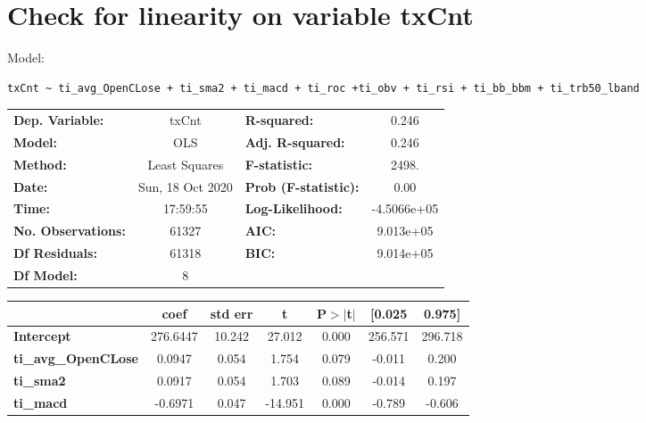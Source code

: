 \section{Check for linearity on variable txCnt}

Model: \begin{verbatim}txCnt ~ ti_avg_OpenCLose + ti_sma2 + ti_macd + ti_roc +ti_obv + ti_rsi + ti_bb_bbm + ti_trb50_lband\end{verbatim}

\begin{center}
\begin{tabular}{lclc}
\toprule
\textbf{Dep. Variable:}     &      txCnt       & \textbf{  R-squared:         } &      0.246   \\
\textbf{Model:}             &       OLS        & \textbf{  Adj. R-squared:    } &      0.246   \\
\textbf{Method:}            &  Least Squares   & \textbf{  F-statistic:       } &      2498.   \\
\textbf{Date:}              & Sun, 18 Oct 2020 & \textbf{  Prob (F-statistic):} &      0.00    \\
\textbf{Time:}              &     17:59:55     & \textbf{  Log-Likelihood:    } & -4.5066e+05  \\
\textbf{No. Observations:}  &       61327      & \textbf{  AIC:               } &  9.013e+05   \\
\textbf{Df Residuals:}      &       61318      & \textbf{  BIC:               } &  9.014e+05   \\
\textbf{Df Model:}          &           8      & \textbf{                     } &              \\
\bottomrule
\end{tabular}
\begin{tabular}{lcccccc}
                            & \textbf{coef} & \textbf{std err} & \textbf{t} & \textbf{P$> |$t$|$} & \textbf{[0.025} & \textbf{0.975]}  \\
\midrule
\textbf{Intercept}          &     276.6447  &       10.242     &    27.012  &         0.000        &      256.571    &      296.718     \\
\textbf{ti\_avg\_OpenCLose} &       0.0947  &        0.054     &     1.754  &         0.079        &       -0.011    &        0.200     \\
\textbf{ti\_sma2}           &       0.0917  &        0.054     &     1.703  &         0.089        &       -0.014    &        0.197     \\
\textbf{ti\_macd}           &      -0.6971  &        0.047     &   -14.951  &         0.000        &       -0.789    &       -0.606     \\

\end{tabular}
\end{center}

